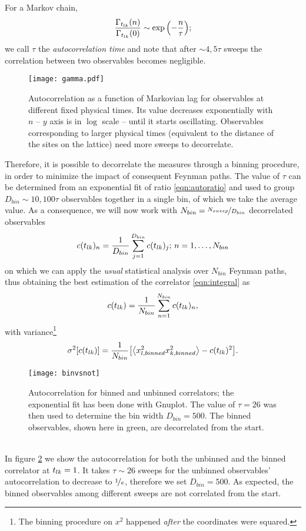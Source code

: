For a Markov chain,
\begin{align}
  \label{eqn:autoratio}
  \frac{\Gamma_{t_{lk}}(n)}{\Gamma_{t_{lk}}(0)} \sim \exp\qty(-\frac{n}{\tau});
\end{align}
we call $\tau$ the \textit{autocorrelation time} and note that after $\sim 4,5 \tau$ sweeps the correlation between two observables becomes
negligible.
\begin{figure}[ht]
  \centering
  \texttt{[image: gamma.pdf]}
  \caption{\label{fig:gammat} Autocorrelation  as a function of Markovian lag for observables at different fixed physical times. Its value decreases exponentially with $n$ -- $y$ axis is in $\log$ scale -- until it starts oscillating. Observables corresponding to larger physical times (equivalent to the distance of the sites on the lattice) need more sweeps to
  decorrelate.}
\end{figure}
Therefore, it is possible to decorrelate the measures through a binning procedure, in order to minimize the impact of consequent Feynman paths.
The value of $\tau$ can be determined from an exponential fit of ratio \ref{eqn:autoratio} and used to group
$D_{bin}\sim 10,100\tau$ observables together in a single bin, of which we take the average value.
As a consequence, we will now work with $N_{bin}=\nicefrac{N_{sweep}}{D_{bin}}$ decorrelated observables
\begin{align}
  \label{eqn:binned}
  c(t_{lk})_{n}= \frac{1}{D_{bin}}\sum_{j=1}^{D_{bin}}c(t_{lk})_{j}; \, n = 1, \dots, N_{bin}
\end{align}
on which we can apply the \textit{usual} statistical analysis over $N_{bin}$ Feynman paths, thus obtaining the best estimation of the correlator \ref{eqn:integral} as
\begin{align}
  \label{eqn:bestestim}
  c(t_{lk}) = \frac{1}{N_{bin}}\sum_{n=1}^{N_{bin}}c(t_{lk})_{n},
\end{align}
with variance\footnote{The binning procedure on $x^{2}$ happened \textit{after} the coordinates were squared.}
\begin{align}
  \label{eqn:bestvariance}
  \sigma^{2}\qty[\ct] = \frac{1}{N_{bin}}\qty[\ev{x_{l,binned}^{2}x_{k,binned}^{2}}-\ct^{2}].
\end{align}
\begin{figure}[h]
  \centering
  \texttt{[image: binvsnot]}
  \caption{\label{fig:binvsnot}Autocorrelation for binned and unbinned correlators; the exponential fit has been done with Gnuplot. The value of $\tau=26$ was then used to determine the bin width
    $D_{bin}=500$. The binned observables, shown here in green,
  are decorrelated from the start.}
\end{figure}
\\
In figure \ref{fig:binvsnot} we show the autocorrelation for both the unbinned and the binned correlator at $t_{lk} = 1$. It takes
$\tau \sim 26$ sweeps for the unbinned observables' autocorrelation to decrease to $\nicefrac{1}{e}$, therefore we set $D_{bin}=500$. As expected,
the binned observables among different sweeps are not correlated from the start.

